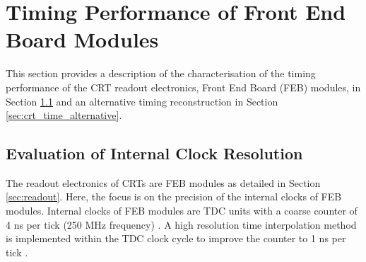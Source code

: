 
\section{Timing Performance of Front End Board Modules}
\label{sec4InternalClock}


This section provides a description of the characterisation of the timing performance of the CRT readout electronics, Front End Board (FEB) modules, in Section \ref{sec:crt_time_precision} and an alternative timing reconstruction in Section \ref{sec:crt_time_alternative}.

\subsection{Evaluation of Internal Clock Resolution}
\label{sec:crt_time_precision}

The readout electronics of CRTs are FEB modules as detailed in Section \ref{sec:readout}.
Here, the focus is on the precision of the internal clocks of FEB modules. 
Internal clocks of FEB modules are TDC units with a coarse counter of 4 ns per tick (250 MHz frequency) \cite{crt_note}. 
A high resolution time interpolation method is implemented within the TDC clock cycle to improve the counter to 1 ns per tick \cite{crt_clock}.


